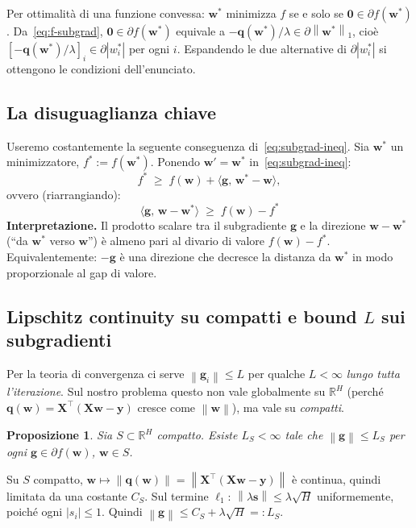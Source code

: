 \documentclass[11pt,a4paper]{article}
\newcommand{\R}{\mathbb{R}}
\newcommand{\norm}[1]{\left\|#1\right\|}
\newcommand{\inner}[2]{\langle #1,\,#2\rangle}
\newcommand{\bw}{\mathbf{w}}
\newcommand{\bg}{\mathbf{g}}
\newcommand{\by}{\mathbf{y}}
\newcommand{\bX}{\mathbf{X}}
\newcommand{\bs}{\mathbf{s}}
\newcommand{\bq}{\mathbf{q}}
\newcommand{\bzero}{\mathbf{0}}
\newtheorem{proposition}[theorem]{Proposizione}
\theoremstyle{definition}
\begin{document}
\begin{tcolorbox}[proofbox]
Per ottimalità di una funzione convessa: $\bw^*$ minimizza $f$ se e solo se $\bzero\in\partial f(\bw^*)$. Da~\eqref{eq:f-subgrad}, $\bzero\in\partial f(\bw^*)$ equivale a $-\bq(\bw^*)/\lambda \in \partial\norm{\bw^*}_1$, cioè $[-\bq(\bw^*)/\lambda]_i \in \partial|w^*_i|$ per ogni $i$. Espandendo le due alternative di $\partial|w^*_i|$ si ottengono le condizioni dell'enunciato.
\end{tcolorbox}

\subsection{La disuguaglianza chiave}

Useremo costantemente la seguente conseguenza di~\eqref{eq:subgrad-ineq}. Sia $\bw^*$ un minimizzatore, $f^* := f(\bw^*)$. Ponendo $\bw' = \bw^*$ in~\eqref{eq:subgrad-ineq}:
\[
f^* \;\ge\; f(\bw) + \inner{\bg}{\bw^*-\bw},
\]
ovvero (riarrangiando):
\begin{equation}
\label{eq:key-ineq}
\boxed{\;\;\inner{\bg}{\bw - \bw^*} \;\ge\; f(\bw) - f^*\;\;}
\end{equation}
\textbf{Interpretazione.} Il prodotto scalare tra il subgradiente $\bg$ e la direzione $\bw-\bw^*$ (``da $\bw^*$ verso $\bw$'') è almeno pari al divario di valore $f(\bw)-f^*$. Equivalentemente: $-\bg$ è una direzione che decresce la distanza da $\bw^*$ in modo proporzionale al gap di valore.

\subsection{Lipschitz continuity su compatti e bound $L$ sui subgradienti}

Per la teoria di convergenza ci serve $\norm{\bg_i}\le L$ per qualche $L<\infty$ \emph{lungo tutta l'iterazione}. Sul nostro problema questo non vale globalmente su $\R^H$ (perché $\bq(\bw) = \bX^\top(\bX\bw-\by)$ cresce come $\norm{\bw}$), ma vale su \emph{compatti}.

\begin{proposition}
Sia $S\subset\R^H$ compatto. Esiste $L_S<\infty$ tale che $\norm{\bg}\le L_S$ per ogni $\bg\in\partial f(\bw)$, $\bw\in S$.
\end{proposition}

\begin{tcolorbox}[proofbox]
Su $S$ compatto, $\bw\mapsto\norm{\bq(\bw)} = \norm{\bX^\top(\bX\bw-\by)}$ è continua, quindi limitata da una costante $C_S$. Sul termine $\ell_1$: $\norm{\lambda\bs}\le\lambda\sqrt{H}$ uniformemente, poiché ogni $|s_i|\le 1$. Quindi $\norm{\bg}\le C_S + \lambda\sqrt{H} =: L_S$.
\end{tcolorbox}
\end{document}
